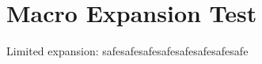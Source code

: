 \documentclass{article}
\begin{document}
\newcommand{\expand}[1]{#1#1#1#1#1#1#1#1}
\newcommand{\bomb}{\expand{\expand{\expand{X}}}}
\section{Macro Expansion Test}
Limited expansion: \expand{safe}
\end{document}
